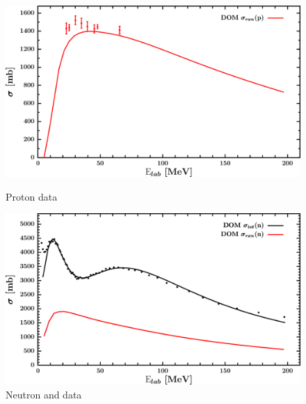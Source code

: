 \begin{figure}[H]
    \centering
    \begin{minipage}{0.45\textwidth}
        \centering
        \includegraphics[width=1.0\textwidth]{figures/sn112_protonInelastic.png}
        \caption{Proton \rxn data}
        \label{DOMFitData_sn112_proton_inelastic}
    \end{minipage}\hfill
    \begin{minipage}{0.45\textwidth}
        \centering
        \includegraphics[width=1.0\textwidth]{figures/sn112_neutronInelastic.png}
        \caption{Neutron \rxn and \tot data}
        \label{DOMFitData_sn112_neutron_inelastic}
    \end{minipage}
\end{figure}

\afterpage{\clearpage}

